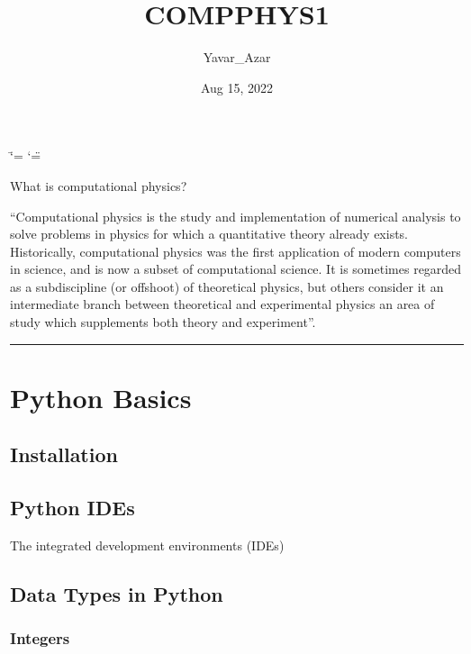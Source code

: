 \documentclass[letterpaper,10pt,english]{sphinxmanual}
\title{COMPPHYS1}
\date{Aug 15, 2022}
\author{Yavar\_Azar}
\begin{document}
\ifdefined\shorthandoff
  \ifnum\catcode`\=\string=\active\shorthandoff{=}\fi
  \ifnum\catcode`\"=\active{}\fi
\fi

\pagestyle{empty}
\sphinxmaketitle
\pagestyle{plain}
\sphinxtableofcontents
\pagestyle{normal}
\label{\detokenize{index::doc}}


\sphinxAtStartPar
What is computational physics?

\sphinxAtStartPar
“Computational physics is the study and implementation of numerical analysis to solve problems in physics for which a quantitative theory already exists. Historically, computational physics was the first application of modern computers in science, and is now a subset of computational science. It is sometimes regarded as a subdiscipline (or offshoot) of theoretical physics, but others consider it an intermediate branch between theoretical and experimental physics \sphinxhyphen{} an area of study which supplements both theory and experiment”.  


\bigskip\hrule\bigskip


\sphinxstepscope


\chapter{Python Basics}
\label{\detokenize{Python/Python:python-basics}}\label{\detokenize{Python/Python::doc}}

\section{Installation}
\label{\detokenize{Python/Python:installation}}

\section{Python IDEs}
\label{\detokenize{Python/Python:python-ides}}
\sphinxAtStartPar
The integrated development environments (IDEs)


\section{Data Types in Python}
\label{\detokenize{Python/Python:data-types-in-python}}

\subsection{Integers}
\label{\detokenize{Python/Python:integers}}
\end{document}
